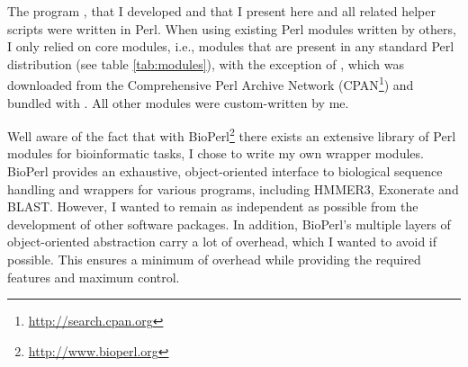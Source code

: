 The program \pname, that I developed and that I present here and all related
helper scripts were written in Perl. When using existing Perl modules written
by others, I only relied on core modules, i.e., modules that are present in any
standard Perl distribution (see table \ref{tab:modules}), with the exception of
 \citep{shan2001}, which was downloaded from the Comprehensive
Perl Archive Network (CPAN\footnote{\url{http://search.cpan.org}}) and bundled
with \pname. All other modules were custom-written by me.



Well aware of the fact that with BioPerl\footnote{\url{http://www.bioperl.org}}
there exists an extensive library of Perl modules for bioinformatic tasks, I
chose to write my own wrapper modules. BioPerl provides an exhaustive,
object-oriented interface to biological sequence handling and wrappers for
various programs, including HMMER3, Exonerate and BLAST. However, I wanted
\pname to remain as independent as possible from the development of other
software packages. In addition, BioPerl's multiple layers of object-oriented
abstraction carry a lot of overhead, which I wanted to avoid if possible. This
ensures a minimum of overhead while providing the required features and maximum
control.
